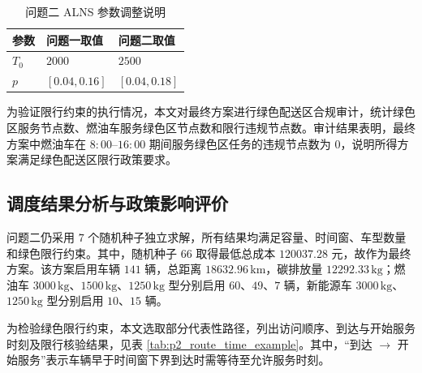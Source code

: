 \documentclass[withoutpreface,bwprint]{cumcmthesis} %
\begin{document}
\begin{table}[H]
\centering
\caption{问题二 ALNS 参数调整说明}
\label{tab:p2_alns_params}
\renewcommand{\arraystretch}{1.16}
\setlength{\tabcolsep}{12pt}
\small
\begin{tabular}{
>{\centering\arraybackslash}p{}
>{\centering\arraybackslash}p{}
>{\centering\arraybackslash}p{}}
\toprule
\rowcolor{tablehead}
\textbf{参数} & \textbf{问题一取值} & \textbf{问题二取值} \\
\midrule
$T_0$ & $2000$ & $2500$ \\
\rowcolor{tablerow}
$p$ & $[0.04,0.16]$ & $[0.04,0.18]$ \\
\bottomrule
\end{tabular}
\end{table}

为验证限行约束的执行情况，本文对最终方案进行绿色配送区合规审计，统计绿色区服务节点数、燃油车服务绿色区节点数和限行违规节点数。审计结果表明，最终方案中燃油车在 $8{:}00$--$16{:}00$ 期间服务绿色区任务的违规节点数为 $0$，说明所得方案满足绿色配送区限行政策要求。

\subsection{调度结果分析与政策影响评价}

问题二仍采用 $7$ 个随机种子独立求解，所有结果均满足容量、时间窗、车型数量和绿色限行约束。其中，随机种子 $66$ 取得最低总成本 $120037.28$ 元，故作为最终方案。该方案启用车辆 $141$ 辆，总距离 $18632.96\,\mathrm{km}$，碳排放量 $12292.33\,\mathrm{kg}$；燃油车 $3000\,\mathrm{kg}$、$1500\,\mathrm{kg}$、$1250\,\mathrm{kg}$ 型分别启用 $60$、$49$、$7$ 辆，新能源车 $3000\,\mathrm{kg}$、$1250\,\mathrm{kg}$ 型分别启用 $10$、$15$ 辆。

为检验绿色限行约束，本文选取部分代表性路径，列出访问顺序、到达与开始服务时刻及限行核验结果，见表 \ref{tab:p2_route_time_example}。其中，“到达 $\rightarrow$ 开始服务”表示车辆早于时间窗下界到达时需等待至允许服务时刻。
\end{document}
